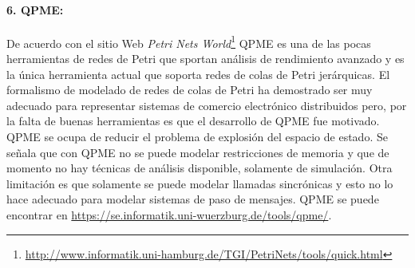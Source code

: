 \documentclass[11pt, twoside]{report}
\begin{document}
\paragraph{6. QPME:} De acuerdo con el sitio Web \emph{Petri Nets World}\footnote{\url{http://www.informatik.uni-hamburg.de/TGI/PetriNets/tools/quick.html}} QPME es una de las pocas herramientas de redes de Petri que sportan análisis de rendimiento avanzado y es la única herramienta actual que soporta redes de colas de Petri jerárquicas. El formalismo de modelado de redes de colas de Petri ha demostrado ser muy adecuado para representar sistemas de comercio electrónico distribuidos pero, por la falta de buenas herramientas es que el desarrollo de QPME fue motivado. QPME se ocupa de reducir el problema de explosión del espacio de estado. Se señala que con QPME no se puede modelar restricciones de memoria y que de momento no hay técnicas de análisis disponible, solamente de simulación. Otra limitación es que solamente se puede modelar llamadas sincrónicas y esto no lo hace adecuado para modelar sistemas de paso de mensajes. QPME se puede encontrar en \url{https://se.informatik.uni-wuerzburg.de/tools/qpme/}.
\end{document}
